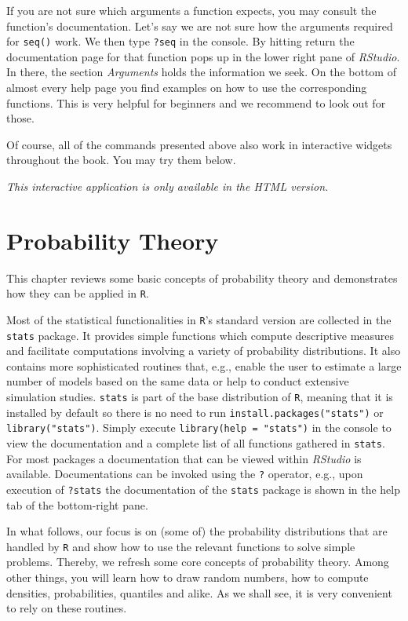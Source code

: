 \documentclass[]{book}
\theoremstyle{definition}
\theoremstyle{definition}
\theoremstyle{definition}
\theoremstyle{remark}
\begin{document}
If you are not sure which arguments a function expects, you may consult
the function's documentation. Let's say we are not sure how the
arguments required for \texttt{seq()} work. We then type \texttt{?seq}
in the console. By hitting return the documentation page for that
function pops up in the lower right pane of \emph{RStudio}. In there,
the section \emph{Arguments} holds the information we seek. On the
bottom of almost every help page you find examples on how to use the
corresponding functions. This is very helpful for beginners and we
recommend to look out for those.

Of course, all of the commands presented above also work in interactive
widgets throughout the book. You may try them below.

\begin{center}\textit{This interactive application is only available in the HTML version.}\end{center}

\chapter{Probability Theory}\label{pt}

This chapter reviews some basic concepts of probability theory and
demonstrates how they can be applied in \texttt{R}.

Most of the statistical functionalities in \texttt{R}'s standard version
are collected in the \texttt{stats} package. It provides simple
functions which compute descriptive measures and facilitate computations
involving a variety of probability distributions. It also contains more
sophisticated routines that, e.g., enable the user to estimate a large
number of models based on the same data or help to conduct extensive
simulation studies. \texttt{stats} is part of the base distribution of
\texttt{R}, meaning that it is installed by default so there is no need
to run \texttt{install.packages("stats")} or \texttt{library("stats")}.
Simply execute \texttt{library(help\ =\ "stats")} in the console to view
the documentation and a complete list of all functions gathered in
\texttt{stats}. For most packages a documentation that can be viewed
within \emph{RStudio} is available. Documentations can be invoked using
the \texttt{?} operator, e.g., upon execution of \texttt{?stats} the
documentation of the \texttt{stats} package is shown in the help tab of
the bottom-right pane.

In what follows, our focus is on (some of) the probability distributions
that are handled by \texttt{R} and show how to use the relevant
functions to solve simple problems. Thereby, we refresh some core
concepts of probability theory. Among other things, you will learn how
to draw random numbers, how to compute densities, probabilities,
quantiles and alike. As we shall see, it is very convenient to rely on
these routines.
\end{document}

